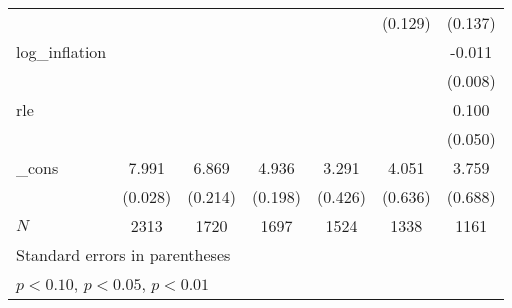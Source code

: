 {\begin{tabular}{l*{6}{c}}
            &                     &                     &                     &                     &     (0.129)         &     (0.137)         \\
\addlinespace
log\_inflation&                     &                     &                     &                     &                     &      -0.011         \\
            &                     &                     &                     &                     &                     &     (0.008)         \\
\addlinespace
rle         &                     &                     &                     &                     &                     &       0.100\sym{**} \\
            &                     &                     &                     &                     &                     &     (0.050)         \\
\addlinespace
\_cons      &       7.991\sym{***}&       6.869\sym{***}&       4.936\sym{***}&       3.291\sym{***}&       4.051\sym{***}&       3.759\sym{***}\\
            &     (0.028)         &     (0.214)         &     (0.198)         &     (0.426)         &     (0.636)         &     (0.688)         \\
\midrule
\(N\)       &        2313         &        1720         &        1697         &        1524         &        1338         &        1161         \\
\bottomrule
\multicolumn{7}{l}{\footnotesize Standard errors in parentheses}\\
\multicolumn{7}{l}{\footnotesize \sym{*} \(p<0.10\), \sym{**} \(p<0.05\), \sym{***} \(p<0.01\)}\\
\end{tabular}
}
